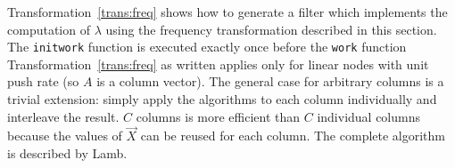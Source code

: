 Transformation~\ref{trans:freq} shows how to generate a 
filter which implements the computation of $\lambda$ using the
frequency transformation described in this section. The
{\tt initwork} function is executed exactly once before
the {\tt work} function
Transformation~\ref{trans:freq} as written applies only for
linear nodes with unit push rate (so $A$ is a column vector).
The general case for arbitrary columns is a trivial extension:
simply apply the algorithms to each column individually and interleave
the result. $C$ columns is more efficient than $C$ individual columns
because the values of $\vec{X}$ can 
be reused for each column. The complete algorithm is described by 
Lamb\cite{lamb-thesis}. 




